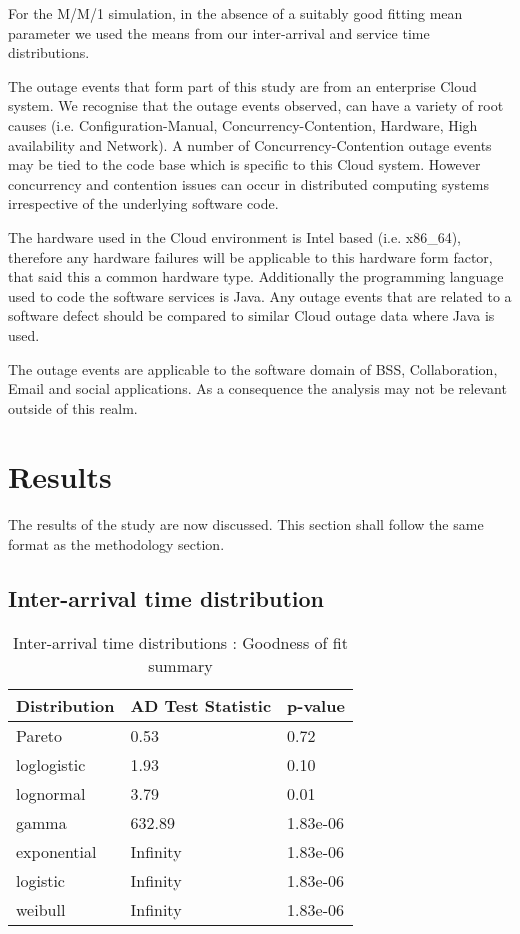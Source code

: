\documentclass[5p]{elsarticle}
\begin{document}
For the M/M/1 simulation, in the absence of a suitably good fitting mean parameter we used the means from our inter-arrival and service time distributions.

The outage events that form part of this study are from an enterprise Cloud system. We recognise that the outage events observed, can have a variety of root causes (i.e. Configuration-Manual, Concurrency-Contention, Hardware, High availability and Network). A number of Concurrency-Contention outage events may be tied to the code base which is specific to this Cloud system. However concurrency and contention issues can occur in distributed computing systems irrespective of the underlying software code.

The hardware used in the Cloud environment is Intel based (i.e. x86\_64), therefore any hardware failures will be applicable to this hardware form factor, that said this a common hardware type. Additionally the programming language used to code the software services is Java. Any outage events that are related to a software defect should be compared to similar Cloud outage data where Java is used.

The outage events are applicable to the software domain of BSS, Collaboration, Email and social applications. As a consequence the analysis may not be relevant outside of this realm.

\section{Results}
The results of the study are now discussed. This section shall follow the same format as the methodology section.

\subsection{Inter-arrival time distribution}

\begin {table}
\caption {Inter-arrival time distributions :  Goodness of fit summary} 
\begin{center}
\begin{tabular}{p{2.1cm} |  p{3.1cm} | p{1.3cm}} \hline \bf{Distribution} & \bf{AD Test Statistic} & \bf{p-value}
\\ \hline Pareto & 0.53 & 0.72 
\\ loglogistic & 1.93 & 0.10
\\ lognormal & 3.79 & 0.01
\\ gamma & 632.89 & 1.83e-06	
\\ exponential & Infinity  & 1.83e-06
\\ logistic & Infinity & 1.83e-06	
\\ weibull  & Infinity & 1.83e-06 
\\ \hline
\end{tabular}
\end{center}
\end{table}
\end{document}
